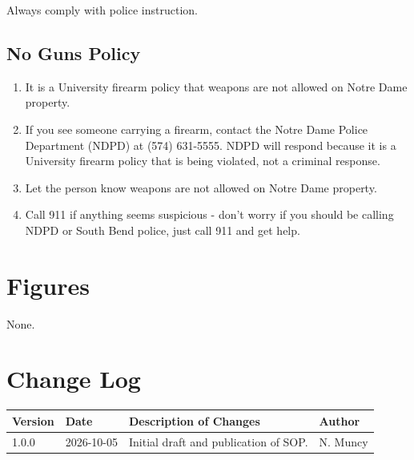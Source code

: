 \documentclass[11pt]{article}
\begin{document}
Always comply with police instruction.


\subsection{No Guns Policy}
\label{ssec:no-guns}

\begin{enumerate}
	\item It is a University firearm policy that weapons are not allowed on Notre Dame property.
	\item If you see someone carrying a firearm, contact the Notre Dame Police Department (NDPD) at (574) 631-5555. NDPD will respond because it is a University firearm policy that is being violated, not a criminal response.
	\item Let the person know weapons are not allowed on Notre Dame property.
	\item Call 911 if anything seems suspicious - don't worry if you should be calling NDPD or South Bend police, just call 911 and get help.
\end{enumerate}


\section{Figures}

None.


\section{Change Log}
\noindent
\begin{tabularx}{\textwidth}{@{} l l X l @{}}
\toprule
\textbf{Version} & \textbf{Date} & \textbf{Description of Changes} & \textbf{Author} \\
\midrule
1.0.0 & 2026-10-05 & Initial draft and publication of SOP. & N. Muncy \\

\bottomrule
\end{tabularx}
\end{document}
